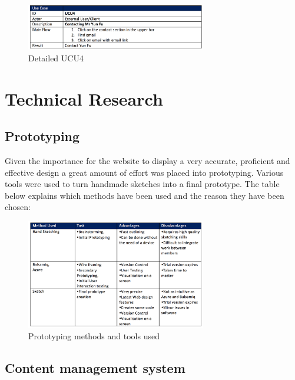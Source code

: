 \documentclass[fontsize=10pt]{extarticle}
\numberwithin{figure}{section} %
\begin{document}
\begin{figure}[H]
      \centering
      \includegraphics[trim = 0 0 0 0, clip, width=0.7\textwidth]{ph11.png}
      \caption{Detailed UCU4}
 \end{figure}

\hypertarget{technical-research}{%
\section{Technical Research}\label{technical-research}}

\hypertarget{prototyping}{%
\subsection{Prototyping}\label{prototyping}}

Given the importance for the website to display a very accurate,
proficient and effective design a great amount of effort was placed into
prototyping. Various tools were used to turn handmade sketches into a
final prototype. The table below explains which methods have been used
and the reason they have been chosen:

\begin{figure}[H]
      \centering
      \includegraphics[trim = 0 0 0 0, clip, width=0.7\textwidth]{ph19.png}
      \caption{Prototyping methods and tools used}
 \end{figure}

\hypertarget{content-management-system}{%
\subsection{Content management system}\label{content-management-system}}
\end{document}
